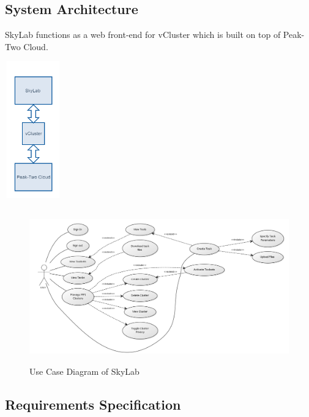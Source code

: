     \subsection{System Architecture}
    SkyLab functions as a web front-end for vCluster which is built on top of Peak-Two Cloud.
   	\begin{center}			
		\includegraphics[width=92px,height=224px]{./images/system_architecture.png}			
	\end{center}	
    



	
    \begin{figure}[ht]
      \centering
      \includegraphics[width=500px,height=250px]{./images/use_case_large.png}
      \caption{Use Case Diagram of SkyLab}\label{System Architecture}
    \end{figure}

    \subsection{Requirements Specification}
